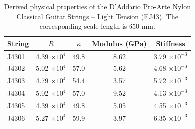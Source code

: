 %

\begin{table}%
  \centering
  \caption{\label{tbl:ej43_props} Derived physical properties of the D'Addario Pro-Arte Nylon Classical Guitar Strings -- Light Tension (EJ43). The corresponding scale length is 650 mm.}
    \begin{tabular}{lcccc}
    \hline \hline
    String  & $R$ & $\kappa$ & Modulus (GPa) & Stiffness \\
    \hline
    J4301 & 4.39 $\times 10^{4}$ & 49.8 & 8.62 & 3.79 $\times 10^{-3}$ \\
    J4302 & 5.02 $\times 10^{4}$ & 57.0 & 5.62 & 4.68 $\times 10^{-3}$ \\
    J4303 & 4.79 $\times 10^{4}$ & 54.4 & 3.57 & 5.72 $\times 10^{-3}$ \\
    J4304 & 5.02 $\times 10^{4}$ & 57.0 & 9.52 & 4.13 $\times 10^{-3}$ \\
    J4305 & 4.39 $\times 10^{4}$ & 49.8 & 5.05 & 4.55 $\times 10^{-3}$ \\
    J4306 & 5.27 $\times 10^{4}$ & 59.9 & 3.97 & 6.35 $\times 10^{-3}$ \\
    \hline
    \end{tabular}%
  \label{tab:addlabel}%
\end{table}%


